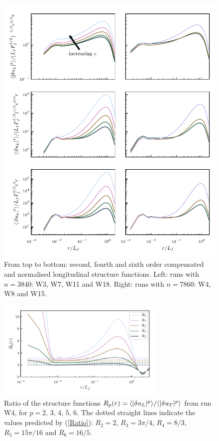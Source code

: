 \begin{figure}
 \centerline{
 \includegraphics[width=5.0in]{../Pyfig/fig_struct_order_246}}
\caption{From top to bottom: second, fourth and sixth order compensated and normalised longitudinal structure functions. Left: runs with $ n=3840 $: W3, W7, W11 and W18. Right: runs with $ n = 7860 $: W4, W8 and W15. }
\label{fig_StrucFunc}
\end{figure}



\begin{figure}
\centerline{\includegraphics[width=8cm]{../Pyfig/fig_ratio_strfct}}
\caption{
Ratio of the structure functions 
$R_p(r) = \langle |\delta u_L|^p \rangle / \langle |\delta u_T|^p \rangle$ from run W4, 
for $ p = 2, \, 3, \, 4, \, 5, \, 6. $
The dotted straight lines indicate the values predicted by (\ref{Ratio}):
$R_2 = 2$, $R_3 = 3\pi/4$,  $R_4 = 8/3$, $ R_5 = 15 \pi /16 $ and $ R_6 = 16/5 $.}
\label{fig_ratio}
\end{figure}



